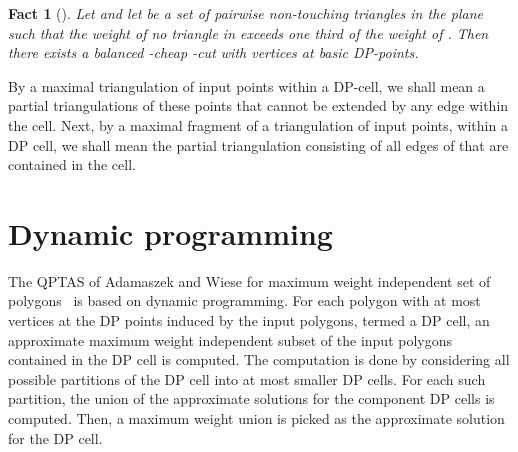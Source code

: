 \documentclass[a4paper]{article}
\newtheorem{fact}{Fact}
\begin{document}
\begin{fact}[\cite{AW14}] Let  
and let  be a set of pairwise non-touching triangles
in the plane such that the weight of no triangle in 
exceeds one third of the weight of . Then there exists
a balanced -cheap -cut 
with vertices at basic DP-points.
\end{fact}

By a maximal triangulation of input points within a DP-cell,
we shall mean a partial
triangulations of these points
that cannot be extended by any edge within the cell.
Next, by a maximal fragment of a triangulation  of input points, within a
DP cell, we shall mean the partial triangulation consisting of all
edges of  that are contained  in the cell.

\section{Dynamic programming}

The QPTAS of Adamaszek and Wiese
for maximum weight independent set of polygons~\cite{AW14} is
based on dynamic programming. For each polygon
with at most  vertices at the 
DP points induced by the input polygons, termed a DP cell, an approximate
maximum weight independent subset of the input polygons contained
in the DP cell is computed. The computation is done
by considering all possible partitions of the DP cell into
at most  smaller DP cells. For each such partition,
the union of the approximate solutions for the component
DP cells is computed. Then, a maximum weight union
is picked as the approximate solution for the DP cell.
\end{document}

